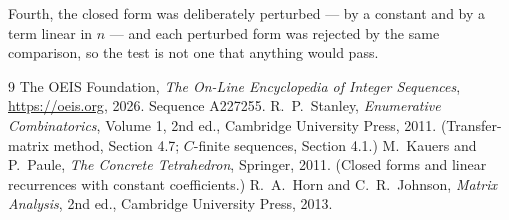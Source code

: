 \documentclass[11pt,a4paper]{article}
\theoremstyle{plain}
\theoremstyle{definition}
\begin{document}
Fourth, the closed form was deliberately perturbed --- by a constant and by a term linear in
$n$ --- and each perturbed form was rejected by the same comparison, so the test is not one
that anything would pass.

\begin{thebibliography}{9}
 The OEIS Foundation, \emph{The On-Line Encyclopedia of Integer
Sequences}, \url{https://oeis.org}, 2026. Sequence A227255.
 R.~P.~Stanley, \emph{Enumerative Combinatorics}, Volume 1, 2nd ed.,
Cambridge University Press, 2011. (Transfer-matrix method, Section 4.7; $C$-finite sequences,
Section 4.1.)
 M.~Kauers and P.~Paule, \emph{The Concrete Tetrahedron}, Springer, 2011.
(Closed forms and linear recurrences with constant coefficients.)
 R.~A.~Horn and C.~R.~Johnson, \emph{Matrix Analysis}, 2nd ed., Cambridge
University Press, 2013.
\end{thebibliography}
\end{document}
